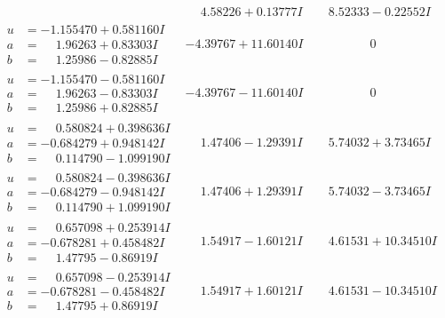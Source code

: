 \documentclass[1p]{elsarticle_modified}
\theoremstyle{definition}
\begin{document}
$$\begin{array}{c|c|c}
 & \phantom{-}4.58226 + 0.13777 I & \phantom{-}8.52333 - 0.22552 I \\ \hline\begin{aligned}
u &= -1.155470 + 0.581160 I \\
a &= \phantom{-}1.96263 + 0.83303 I \\
b &= \phantom{-}1.25986 - 0.82885 I\end{aligned}
 & -4.39767 + 11.60140 I & \phantom{-0.000000 } 0 \\ \hline\begin{aligned}
u &= -1.155470 - 0.581160 I \\
a &= \phantom{-}1.96263 - 0.83303 I \\
b &= \phantom{-}1.25986 + 0.82885 I\end{aligned}
 & -4.39767 - 11.60140 I & \phantom{-0.000000 } 0 \\ \hline\begin{aligned}
u &= \phantom{-}0.580824 + 0.398636 I \\
a &= -0.684279 + 0.948142 I \\
b &= \phantom{-}0.114790 - 1.099190 I\end{aligned}
 & \phantom{-}1.47406 - 1.29391 I & \phantom{-}5.74032 + 3.73465 I \\ \hline\begin{aligned}
u &= \phantom{-}0.580824 - 0.398636 I \\
a &= -0.684279 - 0.948142 I \\
b &= \phantom{-}0.114790 + 1.099190 I\end{aligned}
 & \phantom{-}1.47406 + 1.29391 I & \phantom{-}5.74032 - 3.73465 I \\ \hline\begin{aligned}
u &= \phantom{-}0.657098 + 0.253914 I \\
a &= -0.678281 + 0.458482 I \\
b &= \phantom{-}1.47795 - 0.86919 I\end{aligned}
 & \phantom{-}1.54917 - 1.60121 I & \phantom{-}4.61531 + 10.34510 I \\ \hline\begin{aligned}
u &= \phantom{-}0.657098 - 0.253914 I \\
a &= -0.678281 - 0.458482 I \\
b &= \phantom{-}1.47795 + 0.86919 I\end{aligned}
 & \phantom{-}1.54917 + 1.60121 I & \phantom{-}4.61531 - 10.34510 I \\ \hline\begin{aligned}

\end{aligned}
\end{array}$$
\end{document}
